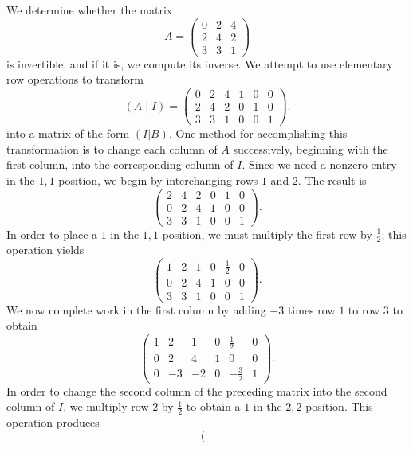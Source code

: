 \begin{example} \label{example 3.2.5}
We determine whether the matrix
\[
    A = \begin{pmatrix} 0 & 2 & 4 \\ 2 & 4 & 2 \\ 3 & 3 & 1 \end{pmatrix}
\]
is invertible, and if it is, we compute its inverse.
We attempt to use elementary row operations to transform
\[
    (A \mid I)
    = \left(\begin{array}{lll|lll}
        0 & 2 & 4 & 1 & 0 & 0 \\
        2 & 4 & 2 & 0 & 1 & 0 \\
        3 & 3 & 1 & 0 & 0 & 1
    \end{array}\right).
\]
into a matrix of the form \((I|B)\).
One method for accomplishing this transformation is to change each column of \(A\) successively, beginning with the first column, into the corresponding column of \(I\).
Since we need a nonzero entry in the \(1,1\) position, we begin by interchanging rows \(1\) and \(2\).
The result is
\[
    \left(\begin{array}{lll|lll}
        2 & 4 & 2 & 0 & 1 & 0 \\
        0 & 2 & 4 & 1 & 0 & 0 \\
        3 & 3 & 1 & 0 & 0 & 1
    \end{array}\right).
\]
In order to place a \(1\) in the \(1, 1\) position, we must multiply the first row by \(\frac1{2}\);
this operation yields
\[
    \left(\begin{array}{lll|lll}
        1 & 2 & 1 & 0 & \frac1{2} & 0 \\
        0 & 2 & 4 & 1 & 0 & 0 \\
        3 & 3 & 1 & 0 & 0 & 1
    \end{array}\right).
\]
We now complete work in the first column by adding \(-3\) times row \(1\) to row \(3\) to obtain
\[
    \left(\begin{array}{lll|lll}
        1 & 2 & 1 & 0 & \frac1{2} & 0 \\
        0 & 2 & 4 & 1 & 0 & 0 \\
        0 & -3 & -2 & 0 & -\frac{3}{2} & 1 
    \end{array}\right).
\]
In order to change the second column of the preceding matrix into the second column of \(I\), we multiply row \(2\) by \(\frac1{2}\) to obtain a \(1\) in the \(2, 2\) position.
This operation produces
\[
    \left(\begin{array}{lll|lll}

\end{array}\]
\end{example}
